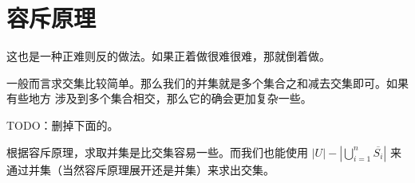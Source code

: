 \section{容斥原理}
\label{sec:容斥定理}

这也是一种正难则反的做法。如果正着做很难很难，那就倒着做。

一般而言求交集比较简单。那么我们的并集就是多个集合之和减去交集即可。如果有些地方
涉及到多个集合相交，那么它的确会更加复杂一些。

TODO：删掉下面的。

根据容斥原理，求取并集是比交集容易一些。而我们也能使用 $|U| - |\bigcup_{i=1}^n
\overline{S_i}|$ 来通过并集（当然容斥原理展开还是并集）来求出交集。
